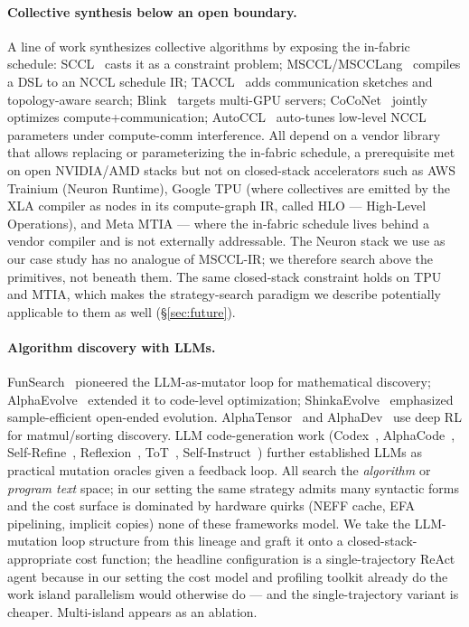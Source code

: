 \paragraph{Collective synthesis below an open boundary.}
A line of work synthesizes collective algorithms by exposing the
in-fabric schedule: SCCL~\cite{cai2021sccl} casts it as a constraint
problem; MSCCL/MSCCLang~\cite{cowan2022msccl} compiles a DSL to an
NCCL schedule IR; TACCL~\cite{shah2023taccl} adds communication
sketches and topology-aware search; Blink~\cite{wang2023blink}
targets multi-GPU servers; CoCoNet~\cite{jangda2022breaking}
jointly optimizes compute+communication;
AutoCCL~\cite{xu2025autoccl} auto-tunes low-level NCCL parameters
under compute-comm interference. All depend on a vendor library
that allows replacing or parameterizing the in-fabric schedule, a
prerequisite met on open NVIDIA/AMD stacks but not on closed-stack
accelerators such as AWS Trainium (Neuron Runtime), Google TPU
(where collectives are emitted by the XLA compiler as nodes in
its compute-graph IR, called HLO --- High-Level Operations), and
Meta MTIA --- where the in-fabric schedule lives behind a vendor
compiler and is not externally addressable. The Neuron stack we use as our case study
has no analogue of MSCCL-IR; we therefore search above the
primitives, not beneath them. The same closed-stack constraint
holds on TPU and MTIA, which makes the strategy-search
paradigm we describe potentially applicable to them as well
(§\ref{sec:future}).

\paragraph{Algorithm discovery with LLMs.}
FunSearch~\cite{romera2024funsearch} pioneered the LLM-as-mutator
loop for mathematical discovery;
AlphaEvolve~\cite{novikov2025alphaevolve} extended it to
code-level optimization;
ShinkaEvolve~\cite{lange2025shinkaevolve} emphasized
sample-efficient open-ended evolution.
AlphaTensor~\cite{fawzi2022alphatensor} and
AlphaDev~\cite{mankowitz2023alphadev} use deep RL for
matmul/sorting discovery. LLM code-generation work
(Codex~\cite{chen2021codex}, AlphaCode~\cite{li2022alphacode},
Self-Refine~\cite{madaan2023selfrefine},
Reflexion~\cite{shinn2023reflexion},
ToT~\cite{yao2023tot},
Self-Instruct~\cite{wang2023selfinstruct}) further established
LLMs as practical mutation oracles given a feedback loop. All
search the \emph{algorithm} or \emph{program text} space; in our
setting the same strategy admits many syntactic forms and the
cost surface is dominated by hardware quirks (NEFF cache, EFA
pipelining, implicit copies) none of these frameworks model. We
take the LLM-mutation loop structure from this lineage and graft
it onto a closed-stack-appropriate cost function; the headline
configuration is a single-trajectory ReAct agent because in our
setting the cost model and profiling toolkit already do the work
island parallelism would otherwise do — and the single-trajectory
variant is cheaper. Multi-island appears as an ablation.


